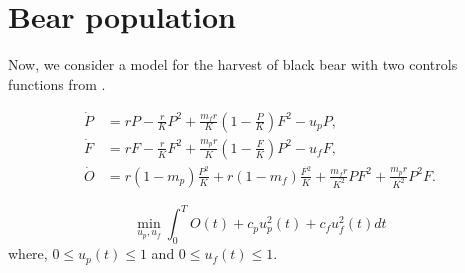 \section{Bear population}  \label{Chap3-Sect3}
Now, we consider a model for the harvest of black bear with two controls 
functions from \citep{BearSalinasLenhart}.

\begin{align*}
	\dot{P}	&= rP - \frac{r}{K}P^2 + \frac{m_f r}{K}\left(1 - \frac{P}{K}\right)F^2
	            - u_p P,
        \\
    \dot{F} &= rF - \frac{r}{K}F^2 + \frac{m_p r}{K}\left(1 - \frac{F}{K}\right)P^2
	            - u_f F,
        \\
    \dot{O} &= r(1 - m_p)\frac{P^2}{K} + r(1 - m_f)\frac{F^2}{K} + 
                \frac{m_f r}{K^2}PF^2 + \frac{m_p r}{K^2}P^2 F.
\end{align*}

$$
    \min_{u_p,u_f} \int_{0}^{T} O(t) + c_p u^{2}_p(t) + c_f u^{2}_f(t) dt
$$
where, $0 \leq u_p (t) \leq 1$ and $0 \leq u_f (t) \leq 1$.

